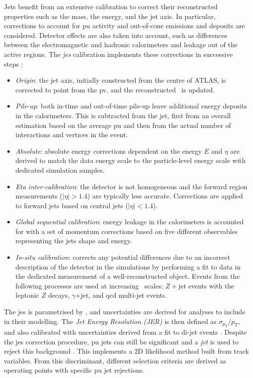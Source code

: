 \newpage
Jets benefit from an extensive calibration to correct their reconstructed properties such as the mass, the energy, and the jet axis. In particular, corrections to account for \gls{pu} activity and out-of-cone emissions and deposits are considered. Detector effects are also taken into account, such as differences between the electromagnetic and hadronic calorimeters and leakage out of the active regions. The \textit{\gls{jes}} calibration implements these corrections in successive steps \cite{ATLASjesjerMeas}: 
\begin{itemize}[leftmargin=*]
\item \textit{Origin}: the jet axis, initially constructed from the centre of ATLAS, is corrected to point from the \gls{pv}, and the reconstructed \pt\ is updated.
\item \textit{Pile-up}: both in-time and out-of-time pile-up leave additional energy deposits in the calorimeters. This is subtracted from the jet, first from an overall estimation based on the average \gls{pu} and then from the actual number of interactions and vertices in the event. 
\item \textit{Absolute}: absolute energy corrections dependent on the energy $E$ and $\eta$ are derived to match the data energy scale to the particle-level energy scale with dedicated simulation samples.
\item \textit{Eta inter-calibration}: the detector is not homogeneous and the forward region measurements ($|\eta|>1.4$) are typically less accurate. Corrections are applied to forward jets based on central jets ($|\eta|<1.4$).
\item \textit{Global sequential calibration}: energy leakage in the calorimeters is accounted for with a set of momentum corrections based on five different observables representing the jets shape and energy.  
\item \textit{In-situ calibration}: corrects any potential differences due to an incorrect description of the detector in the simulations by performing a fit to data in the dedicated measurement of a well-reconstructed object. Events from the following processes are used at increasing \pt\ scales: $Z+$jet events with the leptonic $Z$ decays, $\gamma$+jet, and \gls{qcd} multi-jet events.
\end{itemize}
The \gls{jes} is parametrised by \pt, and uncertainties are derived for analyses to include in their modelling. The \textit{Jet Energy Resolution (JER)} is then defined as $\sigma_{p_T}/p_T$, and also calibrated with uncertainties derived from a fit to di-jet events \cite{ATLASjesjerMeas}. Despite the \gls{jes} correction procedure, \gls{pu} jets can still be significant and a \textit{\gls{jvt}} is used to reject this background \cite{ATLAS-CONF-2014-018}. This implements a 2D likelihood method built from track variables. From this discriminant, different selection criteria are derived as operating points with specific \gls{pu} jet rejections. 

